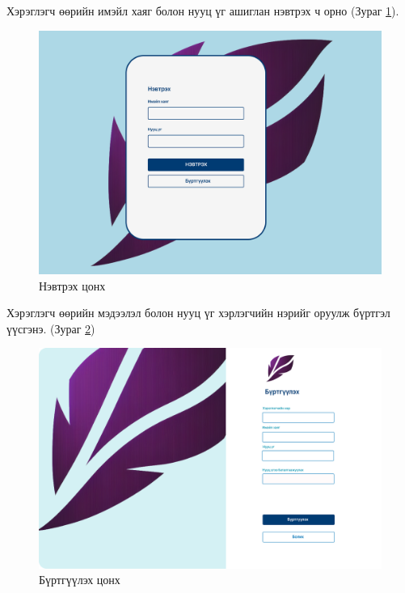 \noindent Хэрэглэгч өөрийн имэйл хаяг болон нууц үг ашиглан нэвтрэх ч орно (Зураг \ref{fig:login}). 
\begin{figure}[H]
    \centering
    \includegraphics[scale=0.25]{Figures/ui/login.png}
    \caption{Нэвтрэх цонх}
    \label{fig:login}
\end{figure}

\noindent Хэрэглэгч өөрийн мэдээлэл болон нууц үг хэрлэгчийн нэрийг оруулж бүртгэл үүсгэнэ. (Зураг \ref{fig:register})
\begin{figure}[H]
    \centering
    \includegraphics[scale=0.35]{Figures/ui/register.png}
    \caption{Бүртгүүлэх цонх}
    \label{fig:register}
\end{figure}

